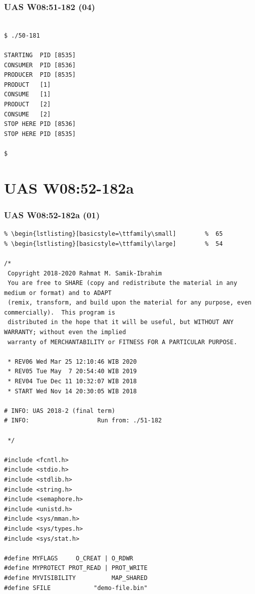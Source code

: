 \documentclass[xcolor=table, notheorems, hyperref={pdfpagelabels=false}]{beamer}
\begin{document}
\begin{frame}[fragile]
\frametitle{UAS W08:51-182 (04)}
\begin{lstlisting}[basicstyle=\ttfamily\large]        %  54

$ ./50-181 

STARTING  PID [8535]
CONSUMER  PID [8536]
PRODUCER  PID [8535]
PRODUCT   [1]
CONSUME   [1]
PRODUCT   [2]
CONSUME   [2]
STOP HERE PID [8536]
STOP HERE PID [8535]

$ 

\end{lstlisting}
\end{frame}

\section{UAS W08:52-182a}
\begin{frame}[fragile]
\frametitle{UAS W08:52-182a (01)}
\begin{lstlisting}[basicstyle=\ttfamily\tiny]         % 108
% \begin{lstlisting}[basicstyle=\ttfamily\footnotesize] %  72
% \begin{lstlisting}[basicstyle=\ttfamily\small]        %  65
% \begin{lstlisting}[basicstyle=\ttfamily\large]        %  54

/*
 Copyright 2018-2020 Rahmat M. Samik-Ibrahim
 You are free to SHARE (copy and redistribute the material in any medium or format) and to ADAPT 
 (remix, transform, and build upon the material for any purpose, even commercially).  This program is
 distributed in the hope that it will be useful, but WITHOUT ANY WARRANTY; without even the implied 
 warranty of MERCHANTABILITY or FITNESS FOR A PARTICULAR PURPOSE.

 * REV06 Wed Mar 25 12:10:46 WIB 2020
 * REV05 Tue May  7 20:54:40 WIB 2019
 * REV04 Tue Dec 11 10:32:07 WIB 2018
 * START Wed Nov 14 20:30:05 WIB 2018

# INFO: UAS 2018-2 (final term)
# INFO:                   Run from: ./51-182 

 */

#include <fcntl.h>
#include <stdio.h>
#include <stdlib.h>
#include <string.h>
#include <semaphore.h>
#include <unistd.h>
#include <sys/mman.h>
#include <sys/types.h>
#include <sys/stat.h>

#define MYFLAGS     O_CREAT | O_RDWR
#define MYPROTECT PROT_READ | PROT_WRITE
#define MYVISIBILITY          MAP_SHARED
#define SFILE            "demo-file.bin"

\end{lstlisting}
\end{frame}
\end{document}
